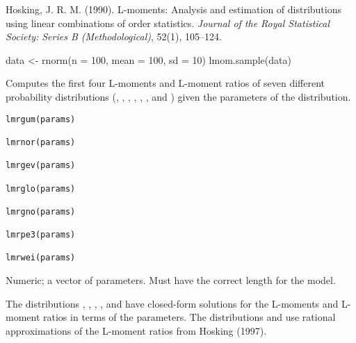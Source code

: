\documentclass[a4paper]{book}
\begin{document}
%
\begin{References}
Hosking, J. R. M. (1990). L-moments: Analysis and estimation of distributions
using linear combinations of order statistics. \emph{Journal of the Royal Statistical
Society: Series B (Methodological)}, 52(1), 105–124.
\end{References}
%
\begin{Examples}
\begin{ExampleCode}
data <- rnorm(n = 100, mean = 100, sd = 10)
lmom.sample(data)

\end{ExampleCode}
\end{Examples}
%
\begin{Description}
Computes the first four L-moments and L-moment ratios of seven different
probability distributions (, , , , , , and )
given the parameters of the distribution.
\end{Description}
%
\begin{Usage}
\begin{verbatim}
lmrgum(params)

lmrnor(params)

lmrgev(params)

lmrglo(params)

lmrgno(params)

lmrpe3(params)

lmrwei(params)
\end{verbatim}
\end{Usage}
%
\begin{Arguments}
\begin{ldescription}
\item[\code{params}] Numeric; a vector of parameters. Must have the correct length for the model.
\end{ldescription}
\end{Arguments}
%
\begin{Details}
The distributions , , , , and  have closed-form solutions
for the L-moments and L-moment ratios in terms of the parameters. The distributions
 and  use rational approximations of the L-moment ratios from Hosking (1997).
\end{Details}
\end{document}
